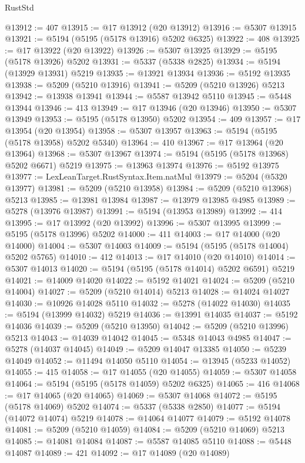 \begin{lexlean}{RustStd}
\begin{coremodule}
@13912 := 407
@13915 := @17 @13912 (@20 @13912)
@13916 := @5307 @13915
@13921 := @5194 (@5195 (@5178 @13916) @5202 @6325)
@13922 := 408
@13925 := @17 @13922 (@20 @13922)
@13926 := @5307 @13925
@13929 := @5195 (@5178 @13926) @5202
@13931 := @5337 (@5338 @2825)
@13934 := @5194 (@13929 @13931) @5219
@13935 := @13921 @13934
@13936 := @5192 @13935
@13938 := @5209 (@5210 @13916)
@13941 := @5209 (@5210 @13926) @5213
@13942 := @13938 @13941
@13944 := @5587 @13942 @5110
@13945 := @5448 @13944
@13946 := 413
@13949 := @17 @13946 (@20 @13946)
@13950 := @5307 @13949
@13953 := @5195 (@5178 @13950) @5202
@13954 := 409
@13957 := @17 @13954 (@20 @13954)
@13958 := @5307 @13957
@13963 := @5194 (@5195 (@5178 @13958) @5202 @5340)
@13964 := 410
@13967 := @17 @13964 (@20 @13964)
@13968 := @5307 @13967
@13974 := @5194 (@5195 (@5178 @13968) @5202 @6671) @5219
@13975 := @13963 @13974
@13976 := @5192 @13975
@13977 := LexLeanTarget.RustSyntax.Item.natMul
@13979 := @5204 (@5320 @13977)
@13981 := @5209 (@5210 @13958)
@13984 := @5209 (@5210 @13968) @5213
@13985 := @13981 @13984
@13987 := @13979 @13985 @4985
@13989 := @5278 (@13976 @13987)
@13991 := @5194 (@13953 @13989)
@13992 := 414
@13995 := @17 @13992 (@20 @13992)
@13996 := @5307 @13995
@13999 := @5195 (@5178 @13996) @5202
@14000 := 411
@14003 := @17 @14000 (@20 @14000)
@14004 := @5307 @14003
@14009 := @5194 (@5195 (@5178 @14004) @5202 @5765)
@14010 := 412
@14013 := @17 @14010 (@20 @14010)
@14014 := @5307 @14013
@14020 := @5194 (@5195 (@5178 @14014) @5202 @6591) @5219
@14021 := @14009 @14020
@14022 := @5192 @14021
@14024 := @5209 (@5210 @14004)
@14027 := @5209 (@5210 @14014) @5213
@14028 := @14024 @14027
@14030 := @10926 @14028 @5110
@14032 := @5278 (@14022 @14030)
@14035 := @5194 (@13999 @14032) @5219
@14036 := @13991 @14035
@14037 := @5192 @14036
@14039 := @5209 (@5210 @13950)
@14042 := @5209 (@5210 @13996) @5213
@14043 := @14039 @14042
@14045 := @5348 @14043 @4985
@14047 := @5278 (@14037 @14045)
@14049 := @5209 @14047 @13385
@14050 := @5239 @14049
@14052 := @11494 @14050 @5110
@14054 := @13945 (@5233 @14052)
@14055 := 415
@14058 := @17 @14055 (@20 @14055)
@14059 := @5307 @14058
@14064 := @5194 (@5195 (@5178 @14059) @5202 @6325)
@14065 := 416
@14068 := @17 @14065 (@20 @14065)
@14069 := @5307 @14068
@14072 := @5195 (@5178 @14069) @5202
@14074 := @5337 (@5338 @2850)
@14077 := @5194 (@14072 @14074) @5219
@14078 := @14064 @14077
@14079 := @5192 @14078
@14081 := @5209 (@5210 @14059)
@14084 := @5209 (@5210 @14069) @5213
@14085 := @14081 @14084
@14087 := @5587 @14085 @5110
@14088 := @5448 @14087
@14089 := 421
@14092 := @17 @14089 (@20 @14089)

\end{coremodule}
\end{lexlean}
